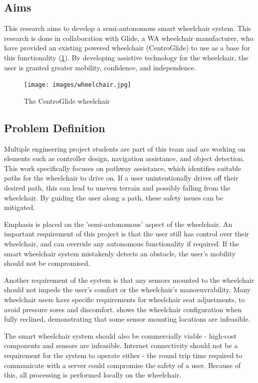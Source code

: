 \documentclass[12pt]{article}
\begin{document}
\subsection{Aims}
This research aims to develop a semi-autonomous smart wheelchair system.
This research is done in collaboration with Glide, a WA wheelchair manufacturer,
who have provided an existing powered wheelchair (CentroGlide) to use as a base
for this functionality (\cref{fig:wheelchair}). By developing assistive technology for the wheelchair,
the user is granted greater mobility, confidence, and independence.

\begin{figure}[H]
    \centering
    \texttt{[image: images/wheelchair.jpg]}
    \caption{The CentroGlide wheelchair}
    \label{fig:wheelchair}
\end{figure}

\pagebreak
\subsection{Problem Definition}
Multiple engineering project students are part of this team
and are working on elements such as controller design, navigation assistance, and object detection.
This work specifically focuses on pathway assistance, which identifies suitable
paths for the wheelchair to drive on. If a user unintentionally drives off their desired path,
this can lead to uneven terrain and possibly falling from the wheelchair.
By guiding the user along a path, these safety issues can be mitigated.

Emphasis is placed on the 'semi-autonomous' aspect of the wheelchair.
An important requirement of this project is that the user still
has control over their wheelchair, and can override any autonomous functionality
if required. If the smart wheelchair system mistakenly detects an obstacle,
the user's mobility should not be compromised.

Another requirement of the system is that any sensors mounted to the wheelchair
should not impede the user's comfort or the wheelchair's manoeuvrability.
Many wheelchair users have specific requirements for wheelchair seat adjustments,
to avoid pressure sores and discomfort.  shows the
wheelchair configuration when fully reclined, demonstrating that some sensor mounting locations
are infeasible.

The smart wheelchair system should also be commercially viable - high-cost
components and sensors are infeasible. Internet connectivity should not be a requirement
for the system to operate either - the round trip time required to communicate with a server
could compromise the safety of a user. Because of this, all processing is performed locally
on the wheelchair.
\end{document}
